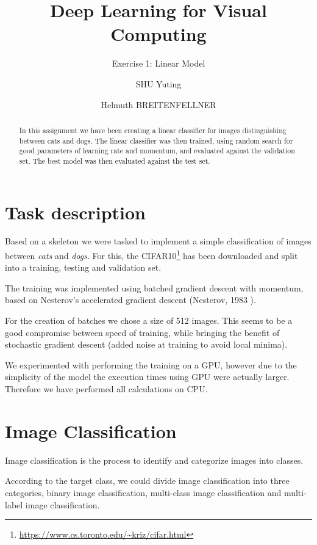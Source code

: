 \documentclass[sigconf,nonacm]{acmart}
\begin{document}
\title{Deep Learning for Visual Computing}
\subtitle{Exercise 1: Linear Model}
\author{SHU Yuting}
\author{Helmuth BREITENFELLNER}
\begin{abstract}
In this assignment we have been creating a linear classifier for images
distinguishing between cats and dogs.
The linear classifier was then trained, using random search for good
parameters of learning rate and momentum, and evaluated against the
validation set.
The best model was then evaluated against the test set.
\end{abstract}
\maketitle
\section{Task description}
Based on a skeleton we were tasked to implement a simple classification
of images between \emph{cats} and \emph{dogs}.
For this, the CIFAR10\footnote{\url{https://www.cs.toronto.edu/~kriz/cifar.html}}
has been downloaded and split into a training, testing and validation
set.

The training was implemented using batched gradient descent with
momentum, based on Nesterov's accelerated gradient descent
(Nesterov, 1983 \cite{Nes83}).

For the creation of batches we chose a size of 512 images.
This seems to be a good compromise between speed of training,
while bringing the benefit of stochastic gradient descent
(added noise at training to avoid local minima).

We experimented with performing the training on a GPU,
however due to the simplicity of the model the execution times using
GPU were actually larger.
Therefore we have performed all calculations on CPU.

\section{Image Classification}

Image classification is the process to identify and categorize images
into classes.

According to the target class, we could divide image classification into three categories, binary image classification, multi-class image classification and multi-label image classification.
\end{document}
